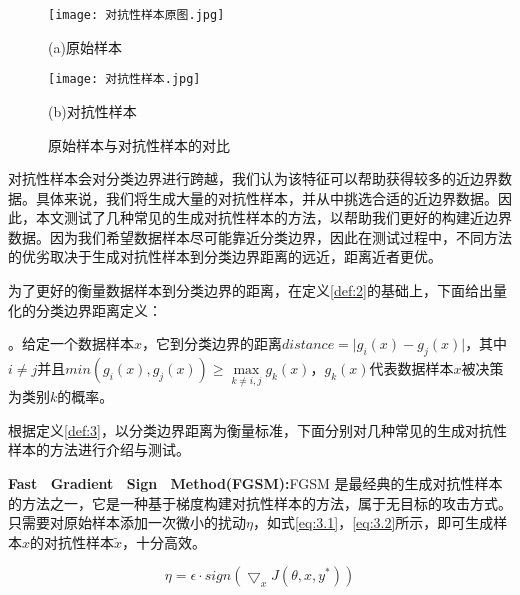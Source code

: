 \begin{figure}[htbp]%
	\begin{minipage}[t]{0.49\linewidth}        %
		\hspace{2mm}
		\centering
		\texttt{[image: 对抗性样本原图.jpg]}
		\centerline{(a)原始样本}
	\end{minipage}
	\begin{minipage}[t]{0.49\linewidth}        %
		\hspace{2mm}
		\centering
		\texttt{[image: 对抗性样本.jpg]}
		\centerline{(b)对抗性样本}
	\end{minipage}
\setlength{\abovecaptionskip}{5mm} %
\caption{原始样本与对抗性样本的对比}
\label{原始样本与对抗性样本对比}
\end {figure}

对抗性样本会对分类边界进行跨越，我们认为该特征可以帮助获得较多的近边界数据。具体来说，我们将生成大量的对抗性样本，并从中挑选合适的近边界数据。因此，本文测试了几种常见的生成对抗性样本的方法，以帮助我们更好的构建近边界数据。因为我们希望数据样本尽可能靠近分类边界，因此在测试过程中，不同方法的优劣取决于生成对抗性样本到分类边界距离的远近，距离近者更优。

为了更好的衡量数据样本到分类边界的距离，在定义\ref{def:2}的基础上，下面给出量化的分类边界距离定义：

\begin{myDef}
	\label{def:3}
	。给定一个数据样本$x$，它到分类边界的距离$distance = \vert g_i(x) - g_j(x) \vert$，其中$i \neq j $并且$min(g_i(x), g_j(x)) \geq \mathop{max} \limits_{k \neq i, j}g_k(x)$，$g_k(x)$代表数据样本$x$被决策为类别$k$的概率。
\end{myDef}

根据定义\ref{def:3}，以分类边界距离为衡量标准，下面分别对几种常见的生成对抗性样本的方法进行介绍与测试。


\noindent\textbf{Fast \ Gradient \ Sign \ Method(FGSM):}FGSM \cite{goodfellow2014explaining}是最经典的生成对抗性样本的方法之一，它是一种基于梯度构建对抗性样本的方法，属于无目标的攻击方式。只需要对原始样本添加一次微小的扰动$\eta$，如式\ref{eq:3.1}，\ref{eq:3.2}所示，即可生成样本$x$的对抗性样本$\tilde{x}$，十分高效。

\begin{equation}
	\label{eq:3.1}
	\eta = \epsilon \cdot sign(\bigtriangledown_xJ(\theta,x,y^*))
\end{equation}

